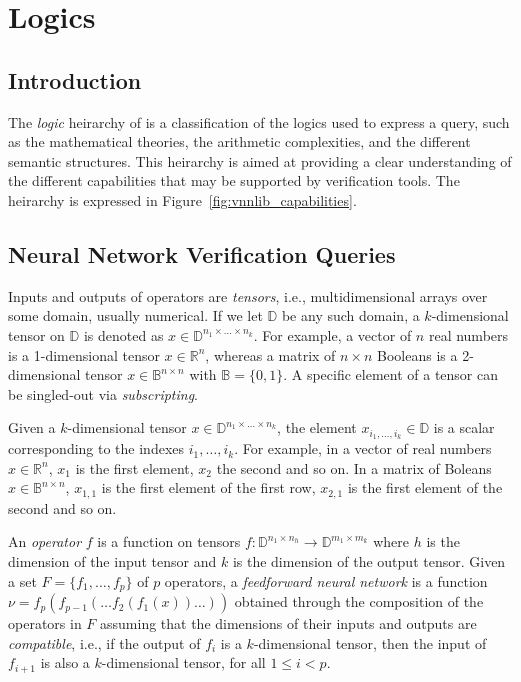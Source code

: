 
\chapter{Logics}
\label{sec:query_categories}

\section{Introduction}

The \textit{logic} heirarchy of \vnnlib{} is a classification of the logics used to 
express a query, such as the mathematical theories, the arithmetic complexities, 
and the different semantic structures. This heirarchy is aimed at providing a clear understanding 
of the different capabilities that may be supported by verification tools. The heirarchy 
is expressed in Figure~\ref{fig:vnnlib_capabilities}.

\section{Neural Network Verification Queries}

Inputs and outputs of operators are \emph{tensors}, i.e.,
multidimensional arrays over some domain, usually numerical. 
If we let $\mathbb{D}$ be any such domain, a $k$-dimensional 
tensor on $\mathbb{D}$ is denoted as $x \in \mathbb{D}^{n_1 
	\times \ldots \times n_k}$.
For example, a vector of $n$ real numbers is a 1-dimensional
tensor $x \in \mathbb{R}^n$, whereas a matrix of $n \times n$ 
Booleans is a 2-dimensional tensor $x \in \mathbb{B}^{n 
	\times n}$ with $\mathbb{B} = \{0, 1\}$. A specific element 
of a tensor can be singled-out via \emph{subscripting}. 

Given a $k$-dimensional tensor $x \in \mathbb{D}^{n_1 \times 
	\ldots \times n_k}$, the element $x_{i_1, \ldots, i_k} \in 
	\mathbb{D}$ is a scalar corresponding to the indexes 
${i_1, \ldots, i_k}$. For example, in a vector of real numbers 
$x \in \mathbb{R}^n$, $x_1$ is the first element, $x_2$ the second 
and so on. In a matrix of Boleans $x \in \mathbb{B}^{n \times
  n}$, $x_{1,1}$ is the first element of the first row, $x_{2,1}$ 
is the first element of the second and so on.

An \emph{operator} $f$ is a function on tensors 
$f: \mathbb{D}^{n_{1} \times n_h} \to \mathbb{D}^{m_{1} \times m_k}$
where $h$ is the dimension of the input tensor and $k$ is the 
dimension of the output tensor. Given a set $F = \{f_1, \ldots, 
	f_p\}$ of $p$ operators, a \emph{feedforward neural network}
is a function $\nu = f_p(f_{p-1}(\ldots f_2(f_1(x))\ldots))$ obtained
through the composition of the operators in $F$ assuming that the 
dimensions of their inputs and outputs are \emph{compatible}, i.e.,
if the  output of $f_i$ is a $k$-dimensional tensor, then the input
of $f_{i+1}$ is also a $k$-dimensional tensor, for all $1 \leq i < p$.

